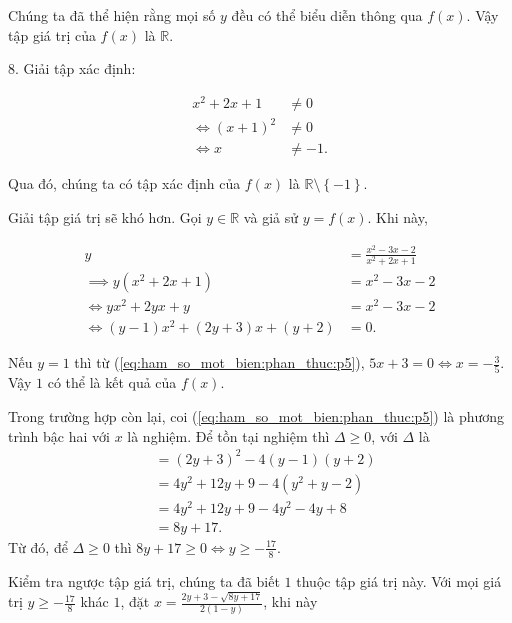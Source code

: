 Chúng ta đã thể hiện rằng mọi số $y$ đều có thể biểu diễn thông qua $f(x)$. Vậy tập giá trị của $f(x)$ là $\mathbb{R}$.

8. Giải tập xác định:

\begin{align*}
   x^2 + 2x + 1 &\neq 0 \\
   \iff (x + 1)^2 &\neq 0 \\
   \iff x &\neq -1.
\end{align*}

Qua đó, chúng ta có tập xác định của $f(x)$ là $\mathbb{R} \setminus \left\{-1\right\}$.

Giải tập giá trị sẽ khó hơn. Gọi $y\in\mathbb{R}$ và giả sử $y = f(x)$. Khi này,

\begin{align}
   y &= \frac{x^2 - 3x - 2}{x^2 + 2x + 1} \nonumber\\
   \implies y(x^2 + 2x + 1) &= x^2 - 3x - 2 \nonumber\\
   \iff yx^2 + 2yx + y &= x^2 - 3x - 2 \nonumber\\
   \iff (y - 1)x^2 + (2y + 3)x + (y + 2) &= 0. \label{eq:ham_so_mot_bien:phan_thuc:p5}
\end{align}

Nếu $y = 1$ thì từ (\ref{eq:ham_so_mot_bien:phan_thuc:p5}), $5x + 3 = 0 \iff x = -\frac{3}{5}$. Vậy $1$ có thể là kết quả của $f(x)$.

Trong trường hợp còn lại, coi (\ref{eq:ham_so_mot_bien:phan_thuc:p5}) là phương trình bậc hai với $x$ là nghiệm. Để tồn tại nghiệm thì $\Delta \geq 0$, với $\Delta$ là 
\begin{align*}
   &= (2y + 3)^2 - 4(y - 1)(y + 2) \\
   &= 4y^2 + 12y + 9 - 4(y^2 + y - 2) \\
   &= 4y^2 + 12y + 9 - 4y^2 - 4y + 8 \\
   &= 8y + 17.
\end{align*}
Từ đó, để $\Delta \geq 0$ thì $8y + 17 \geq 0 \iff y \geq -\frac{17}{8}$.

Kiểm tra ngược tập giá trị, chúng ta đã biết $1$ thuộc tập giá trị này. Với mọi giá trị $y \geq -\frac{17}{8}$ khác $1$, đặt $x = \frac{2y + 3 - \sqrt{8y + 17}}{2(1 - y)}$, khi này

